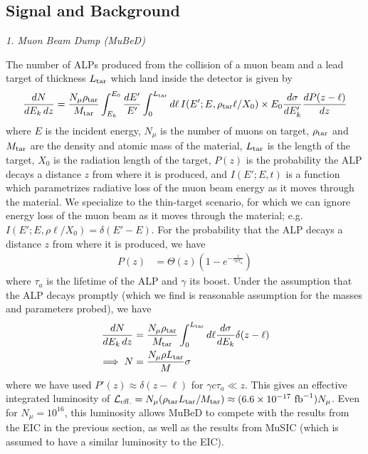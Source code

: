 \subsection{Signal and Background}\label{MuSIC_MuBeD_ALP_BG}


\begin{center}
    {\it 1. Muon Beam Dump (MuBeD)}
\end{center}

The number of ALPs produced from the collision of a muon beam and a lead target of thickness $L_{\rm tar}$ which land inside the detector is given by \cite{Bjorken:2009mm,Cesarotti:2023sje}
\begin{align}
    \frac{dN}{dE_k\,dz} = \frac{N_\mu \rho_{\rm tar}}{M_{\rm tar}}\int_{E_k}^{E_0}{\frac{dE'}{E'}\int_0^{L_{\rm tar}} d\ell\,I(E'; E, \rho_{\rm tar}\ell/X_0)\times E_0\frac{d\sigma}{dE_k'}\frac{dP(z-\ell)}{dz}}
\end{align}
where $E$ is the incident energy, $N_\mu$ is the number of muons on target, $\rho_{\rm tar}$ and $M_{\rm tar}$ are the density and atomic mass of the material, $L_{\rm tar}$ is the length of the target, $X_0$ is the radiation length of the target, $P(z)$ is the probability the ALP decays a distance $z$ from where it is produced, and $I(E'; E, t)$ is a function which parametrizes radiative loss of the muon beam energy as it moves through the material. We specialize to the thin-target scenario, for which we can ignore energy loss of the muon beam as it moves through the material; e.g. $I(E'; E, \rho\ell/X_0) = \delta(E' - E)$. For the probability that the ALP decays a distance $z$ from where it is produced, we have
\begin{align}
    P(z) &= \Theta(z) \left(1-e^{-\frac{z}{\gamma c \tau_a}}\right)
\end{align}
where $\tau_a$ is the lifetime of the ALP and $\gamma$ its boost. Under the assumption that the ALP decays promptly (which we find is reasonable assumption for the masses and parameters probed), we have 
\begin{align}
    \frac{dN}{dE_k\,dz} &= \frac{N_\mu \rho_{\rm tar}}{M_{\rm tar}}\int_0^{L_{\rm tar}} d\ell\frac{d\sigma}{dE_k}\delta(z - \ell)\nonumber \\
    \implies N &= \frac{N_\mu \rho L_{\rm tar}}{M}\sigma
\end{align}
where we have used $P'(z) \approx \delta(z-\ell)$ for $\gamma c\tau_a \ll z$. This gives an effective integrated luminosity of ${\cal L}_{\rm eff.} = N_\mu (\rho_{\rm tar} L_{\rm tar}/M_{\rm tar})\approx (6.6\times 10^{-17}~{\rm fb}^{-1}) N_\mu$. Even for $N_\mu = 10^{16}$, this luminosity allows MuBeD to compete with the results from the EIC in the previous section, as well as the results from MuSIC (which is assumed to have a similar luminosity to the EIC). 

